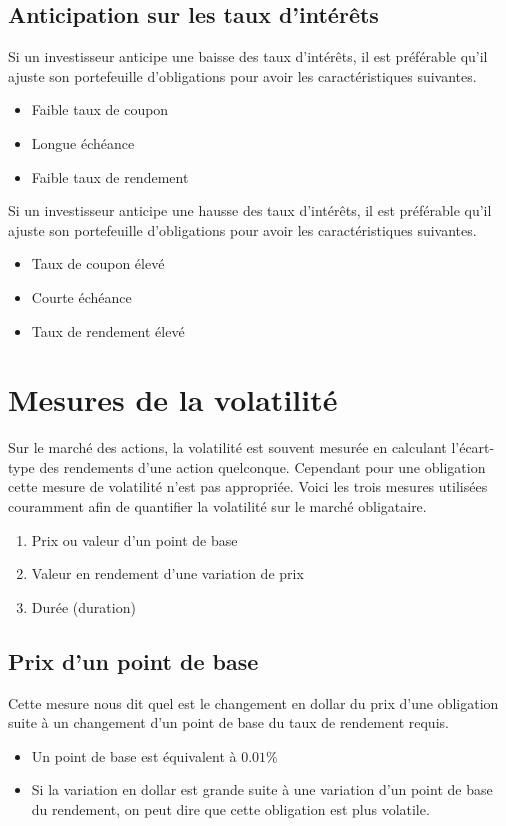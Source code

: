 \documentclass[letterpaper, 12pt]{article}
\newcommand{\1}{\mathds{1}}	%
\theoremstyle{definition}
\begin{document}
\subsection{Anticipation sur les taux d'intérêts}
Si un investisseur anticipe une baisse des taux d'intérêts,  il est préférable qu'il ajuste son portefeuille d'obligations pour avoir les caractéristiques suivantes.
\begin{itemize}
\item Faible taux de coupon
\item Longue échéance 
\item Faible taux de rendement 
\end{itemize}
Si un investisseur anticipe une hausse des taux d'intérêts, il est préférable qu'il ajuste son portefeuille d'obligations pour avoir les caractéristiques suivantes.
\begin{itemize}
\item Taux de coupon élevé
\item Courte échéance 
\item Taux de rendement élevé
\end{itemize}
\section{Mesures de la volatilité}
Sur le marché des actions, la volatilité est souvent mesurée en calculant l'écart-type des rendements d'une action quelconque. Cependant pour une obligation cette mesure de volatilité n'est pas appropriée.  Voici les trois mesures utilisées couramment afin de quantifier la volatilité sur le marché obligataire.
\begin{enumerate}
\item Prix ou valeur d’un point de base
\item Valeur en rendement d’une variation de prix
\item Durée (duration)
\end{enumerate}
\subsection{Prix d’un point de base}
Cette mesure nous dit quel est le changement en dollar du prix d'une obligation suite à un changement d'un point de base du taux de rendement requis.
\begin{itemize}
\item Un point de base est équivalent à $0.01\%$
\item Si la variation en dollar est grande suite à une variation d'un point de base du rendement, on peut dire que cette obligation est plus volatile.
\end{itemize}
\end{document}
